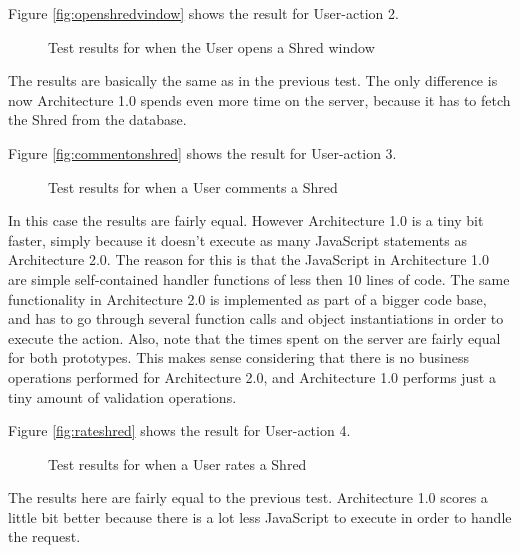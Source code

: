 Figure \vref{fig:openshredvindow} shows the result for User-action 2. 
\begin{figure}
\begin{center}
\end{center}
\caption{Test results for when the User opens a Shred window}\label{fig:openshredvindow}
\end{figure}
The results are basically the same as in the previous test. The only difference is now Architecture 1.0 spends even more time on the server, because it has to fetch the Shred from the database.  

Figure \vref{fig:commentonshred} shows the result for User-action 3. 
\begin{figure}
\begin{center}
\end{center}
\caption{Test results for when a User comments a Shred}\label{fig:commentonshred}
\end{figure}
In this case the results are fairly equal. However Architecture 1.0 is a tiny bit faster, simply because it doesn't execute as many JavaScript statements as Architecture 2.0. The reason for this is that the JavaScript in Architecture 1.0 are simple self-contained handler functions of less then 10 lines of code. The same functionality in Architecture 2.0 is implemented as part of a bigger code base, and has to go through several function calls and object instantiations in order to execute the action. Also, note that the times spent on the server are fairly equal for both prototypes. This makes sense considering that there is no business operations performed for Architecture 2.0, and Architecture 1.0 performs just a tiny amount of validation operations.


Figure \vref{fig:rateshred} shows the result for User-action 4. 
\begin{figure}
\begin{center}
\end{center}
\caption{Test results for when a User rates a Shred}\label{fig:rateshred}
\end{figure}
The results here are fairly equal to the previous test. Architecture 1.0 scores a little bit better because there is a lot less JavaScript to execute in order to handle the request. 

